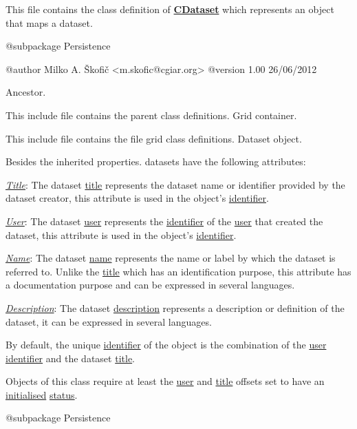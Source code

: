 This file contains the class definition of {\bfseries \hyperlink{class_c_dataset}{C\-Dataset}} which represents an object that maps a dataset.

\begin{DoxyVerb} @subpackage        Persistence

 @author            Milko A. Škofič <m.skofic@cgiar.org>
 @version   1.00 26/06/2012\end{DoxyVerb}


Ancestor.

This include file contains the parent class definitions. Grid container.

This include file contains the file grid class definitions. Dataset object.

Besides the inherited properties. datasets have the following attributes\-:


\begin{DoxyItemize}
\item {\itshape \hyperlink{}{Title}}\-: The dataset \hyperlink{}{title} represents the dataset name or identifier provided by the dataset creator, this attribute is used in the object's \hyperlink{}{identifier}. 
\item {\itshape \hyperlink{}{User}}\-: The dataset \hyperlink{}{user} represents the \hyperlink{}{identifier} of the \hyperlink{class_c_user}{user} that created the dataset, this attribute is used in the object's \hyperlink{}{identifier}. 
\item {\itshape \hyperlink{}{Name}}\-: The dataset \hyperlink{}{name} represents the name or label by which the dataset is referred to. Unlike the \hyperlink{}{title} which has an identification purpose, this attribute has a documentation purpose and can be expressed in several languages. 
\item {\itshape \hyperlink{}{Description}}\-: The dataset \hyperlink{}{description} represents a description or definition of the dataset, it can be expressed in several languages. 
\end{DoxyItemize}

By default, the unique \hyperlink{}{identifier} of the object is the combination of the \hyperlink{}{user} \hyperlink{}{identifier} and the dataset \hyperlink{}{title}.

Objects of this class require at least the \hyperlink{}{user} and \hyperlink{}{title} offsets set to have an \hyperlink{}{initialised} \hyperlink{}{status}.

\begin{DoxyVerb} @subpackage        Persistence\end{DoxyVerb}


